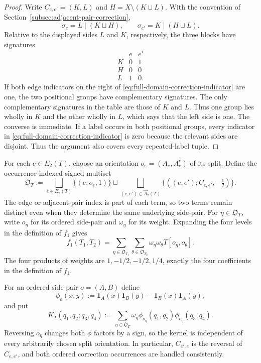 \documentclass[11pt]{article}
\newcommand{\ind}{\mathbf 1}
\begin{document}
\begin{proof}
Write $C_{e,e'}=(K,L)$ and
$H=X\setminus(K\sqcup L)$.  With the convention of
Section~\ref{subsec:adjacent-pair-correction},
\[
 \sigma_e=L\mid(K\sqcup H),
 \qquad
 \sigma_{e'}=K\mid(H\sqcup L).
\]
Relative to the displayed sides $L$ and $K$, respectively, the three blocks
have signatures
\[
\begin{array}{c|cc}
&e&e'\\
\hline
K&0&1\\
H&0&0\\
L&1&0.
\end{array}
\]
If both edge indicators on the right of
\eqref{eq:full-domain-correction-indicator} are one, the two positional
groups have complementary signatures.  The only complementary signatures in
the table are those of $K$ and $L$.  Thus one group lies wholly in $K$ and
the other wholly in $L$, which says that the left side is one.  The converse
is immediate.  If a label occurs in both positional groups, every indicator
in \eqref{eq:full-domain-correction-indicator} is zero because the relevant
sides are disjoint.  Thus the argument also covers every repeated-label
tuple.
\end{proof}

For each $e\in E_2(T)$, choose an orientation
$o_e=(A_e,A_e^c)$ of its split.  Define the occurrence-indexed
signed multiset
\begin{equation}\label{eq:signed-occurrence-multiset}
 \mathfrak O_T
 :=\bigsqcup_{e\in E_2(T)}\{(e;o_e,1)\}
 \sqcup
 \bigsqcup_{(e,e')\in\overrightarrow A_2(T)}
 \{((e,e');C_{e,e'},-\tfrac12)\}.
\end{equation}
The edge or adjacent-pair index is part of each term, so two terms remain
distinct even when they determine the same underlying side-pair.  For
$\eta\in\mathfrak O_T$, write $o_\eta$ for its ordered side-pair and
$\omega_\eta$ for its weight.  Expanding the four levels in the definition
of $f_1$ gives
\begin{equation}\label{eq:occurrence-expansion-f1}
 f_1(T_1,T_2)
 =\sum_{\eta\in\mathfrak O_{T_1}}
  \sum_{\theta\in\mathfrak O_{T_2}}
  \omega_\eta\omega_\theta T[o_\eta,o_\theta].
\end{equation}
The four products of weights are $1,-1/2,-1/2,1/4$, exactly the four
coefficients in the definition of $f_1$.

For an ordered side-pair $o=(A,B)$ define
\begin{equation}\label{eq:antisymmetric-side-pair-function}
 \phi_o(x,y)
 :=\ind_A(x)\ind_B(y)-\ind_B(x)\ind_A(y),
\end{equation}
and put
\begin{equation}\label{eq:kernel-definition}
 K_T(q_1,q_2;q_3,q_4)
 :=\sum_{\eta\in\mathfrak O_T}
 \omega_\eta
 \phi_{o_\eta}(q_1,q_2)\phi_{o_\eta}(q_3,q_4).
\end{equation}
Reversing $o_\eta$ changes both $\phi$ factors by a sign, so the kernel is
independent of every arbitrarily chosen split orientation.  In particular,
$C_{e',e}$ is the reversal of $C_{e,e'}$, and both ordered correction
occurrences are handled consistently.
\end{document}
